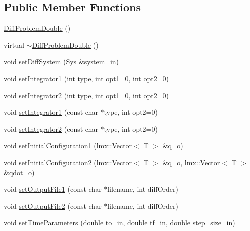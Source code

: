 \subsection*{Public Member Functions}
\begin{DoxyCompactItemize}
\item 
\hyperlink{classlmx_1_1DiffProblemDouble_ae8c3d384622ae1fa70c2a47afac70862}{Diff\-Problem\-Double} ()
\item 
virtual \hyperlink{classlmx_1_1DiffProblemDouble_adbb22b63b9fb8a836cffe43d56acc18e}{$\sim$\-Diff\-Problem\-Double} ()
\item 
void \hyperlink{classlmx_1_1DiffProblemDouble_a6637a9ec5c42651860b86fc647629ec9}{set\-Diff\-System} (Sys \&system\-\_\-in)
\item 
void \hyperlink{classlmx_1_1DiffProblemDouble_a9d8e6aed840c0e58abec933593ed711f}{set\-Integrator1} (int type, int opt1=0, int opt2=0)
\item 
void \hyperlink{classlmx_1_1DiffProblemDouble_a3f04c4bdd5053f4cd1d42d86fa62b9f9}{set\-Integrator2} (int type, int opt1=0, int opt2=0)
\item 
void \hyperlink{classlmx_1_1DiffProblemDouble_ab74169307a19b84de9eacbf2f72cc969}{set\-Integrator1} (const char $\ast$type, int opt2=0)
\item 
void \hyperlink{classlmx_1_1DiffProblemDouble_a06bcb3ca3b14dd1d43a56876df5be2f7}{set\-Integrator2} (const char $\ast$type, int opt2=0)
\item 
void \hyperlink{classlmx_1_1DiffProblemDouble_a3904b3ac77d965496dbfa34bd40710a9}{set\-Initial\-Configuration1} (\hyperlink{classlmx_1_1Vector}{lmx\-::\-Vector}$<$ T $>$ \&q\-\_\-o)
\item 
void \hyperlink{classlmx_1_1DiffProblemDouble_aeb674ac0fae825ba27739389da86d690}{set\-Initial\-Configuration2} (\hyperlink{classlmx_1_1Vector}{lmx\-::\-Vector}$<$ T $>$ \&q\-\_\-o, \hyperlink{classlmx_1_1Vector}{lmx\-::\-Vector}$<$ T $>$ \&qdot\-\_\-o)
\item 
void \hyperlink{classlmx_1_1DiffProblemDouble_a335cc81dc14a60c647e1b4cef52aeac9}{set\-Output\-File1} (const char $\ast$filename, int diff\-Order)
\item 
void \hyperlink{classlmx_1_1DiffProblemDouble_ae34168c45bce6a838d884dbaf505a275}{set\-Output\-File2} (const char $\ast$filename, int diff\-Order)
\item 
void \hyperlink{classlmx_1_1DiffProblemDouble_af30336003f2ae2ff91dc73428ac1f55d}{set\-Time\-Parameters} (double to\-\_\-in, double tf\-\_\-in, double step\-\_\-size\-\_\-in)

\end{DoxyCompactItemize}
